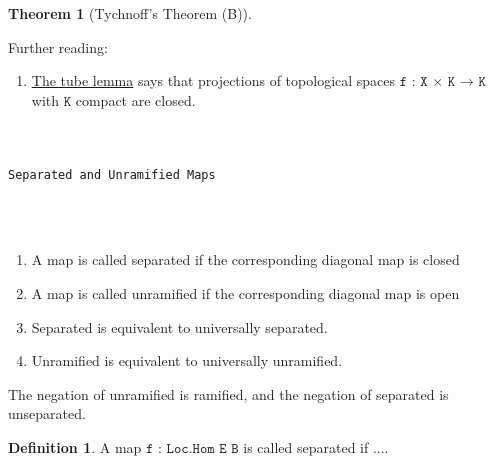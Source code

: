 \documentclass{book}
\theoremstyle{definition}
\newtheorem{definition}{Definition}
\newtheorem{theorem}{Theorem}
\newcounter{lcounter}
\renewcommand{\chapter}[1]{
\newpage
{
\Huge 
\begin{center}
\ \\
\ \\
\thispagestyle{empty}
\texttt{#1}
\end{center}}
\ \\
\ \\
}
\begin{document}
\begin{theorem}[Tychnoff's Theorem (B)]

\end{theorem}

Further reading:
\begin{enumerate}
\item \href{https://en.wikipedia.org/wiki/Tube_lemma}{The tube lemma} says that projections of topological spaces $\texttt{f : X × K → K}$ with $\texttt{K}$ compact are closed.
\end{enumerate}

\chapter{Separated and Unramified Maps}

\begin{enumerate}
\item A map is called separated if the corresponding diagonal map is closed
\item A map is called unramified if the corresponding diagonal map is open
\item Separated is equivalent to universally separated.
\item Unramified is equivalent to universally unramified. 
\end{enumerate}

The negation of unramified is ramified, and the negation of separated is unseparated.

\begin{definition}
A map $\texttt{f : Loc.Hom E B}$ is called separated if ....
\end{definition}

\begin{center}
\begin{tcolorbox}[width=5in,colback={white},title={\begin{center}\texttt{Lean \thelcounter} \addtocounter{lcounter}{1}  \end{center}},colbacktitle=Blue,coltitle=black]
\begin{verbatim}

\end{verbatim}
\end{tcolorbox}
\end{center}
\end{document}
